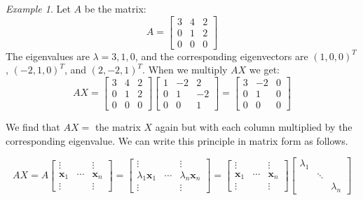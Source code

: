 \documentclass[11pt,oneside]{amsbook}
\theoremstyle{definition}
\theoremstyle{plain}
\theoremstyle{definition}
\theoremstyle{remark}
\newtheorem{example}[theorem]{Example}
\numberwithin{equation}{section}
\numberwithin{figure}{section}
\begin{document}
\begin{example}
  Let $A$ be the matrix:
  \[A=\begin{bmatrix}
      3 & 4 & 2 \\
      0 & 1 & 2 \\
      0 & 0 & 0
      \end{bmatrix}
  \]
  The eigenvalues are $\lambda=3,1,0$, and the corresponding eigenvectors are $(1,0,0)^T$, $(-2,1,0)^T$, and $(2,-2,1)^T$. When we multiply $AX$ we get:
  \[AX=\begin{bmatrix}
      3 & 4 & 2 \\
      0 & 1 & 2 \\
      0 & 0 & 0
    \end{bmatrix}
    \begin{bmatrix}
      1 & -2 & 2 \\
      0 & 1 & -2 \\
      0 & 0 & 1
    \end{bmatrix}
    =
    \begin{bmatrix}
      3 & -2 & 0 \\
      0 & 1 & 0 \\
      0 & 0 & 0
    \end{bmatrix}      
  \]
\end{example}

We find that $AX=$ the matrix $X$ again but with each column multiplied by the corresponding eigenvalue. We can write this principle in matrix form as follows.

\[AX=A\begin{bmatrix}
    \vdots&&\vdots\\
    \mathbf{x}_1&\cdots&\mathbf{x}_n\\
    \vdots&&\vdots
  \end{bmatrix}
  =\begin{bmatrix}
    \vdots&&\vdots\\
    \lambda_1\mathbf{x}_1&\cdots&\lambda_n\mathbf{x}_n\\
    \vdots&&\vdots
  \end{bmatrix}
  =\begin{bmatrix}
    \vdots&&\vdots\\
    \mathbf{x}_1&\cdots&\mathbf{x}_n\\
    \vdots&&\vdots
  \end{bmatrix}
  \begin{bmatrix}
    \lambda_1\\&\ddots&\\&&\lambda_n
  \end{bmatrix}
\]
\end{document}
